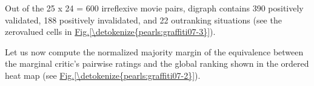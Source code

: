 \documentclass[a4paper,12pt,english]{sphinxhowto}
\begin{document}
\sphinxAtStartPar
Out of the 25 x 24 = 600 irreflexive movie pairs, digraph  contains 390 positively validated, 188 positively invalidated, and 22  outranking situations (see the zero\sphinxhyphen{}valued cells in \hyperref[\detokenize{pearls:graffiti07-3}]{Fig.\@ \ref{\detokenize{pearls:graffiti07-3}}}).

\sphinxAtStartPar
Let us now compute the normalized majority margin   of the equivalence between the marginal critic’s pairwise ratings and the global  ranking shown in the ordered heat map (see \hyperref[\detokenize{pearls:graffiti07-2}]{Fig.\@ \ref{\detokenize{pearls:graffiti07-2}}}).
\def\sphinxLiteralBlockLabel{\label{\detokenize{pearls:margcorr}}}
%
\end{document}
